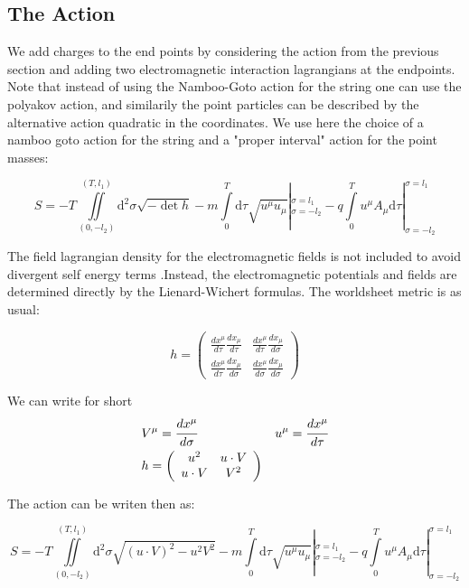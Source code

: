 \documentclass[11pt,a4paper]{article}
\begin{document}
\FloatBarrier
\subsection{The Action}

We add charges to the end points by considering the action from the previous section and adding two electromagnetic interaction lagrangians at the endpoints. Note that instead of using the Namboo-Goto action for the string one can use the polyakov action, and similarily the point particles can be described by the alternative action quadratic in the coordinates. We use here the choice of a namboo goto action for the string and a "proper interval" action for the point masses:

\begin{equation}
S=-T\iint\limits_{(0,-l_{2})}^{(T,l_{1})}\mathrm{d}^{2}\sigma\sqrt{-\det h}-m\int\limits_{0}^{T}\mathrm{d}\tau\sqrt{u^{\mu}u_{\mu}}|_{\sigma=-l_{2}}^{\sigma=l_{1}}-q\int\limits_{0}^{T}u^{\mu}A_{\mu}\mathrm{d}\tau|_{\sigma=-l_{2}}^{\sigma=l_{1}}
\end{equation}

The field lagrangian density for the electromagnetic fields is not included to avoid divergent self energy terms .Instead, the electromagnetic potentials and fields are determined directly by the Lienard-Wichert formulas. The worldsheet metric is as usual:

\begin{equation*}
h=
\begin{pmatrix}
\frac{dx^{\mu}}{d\tau}\frac{dx_{\mu}}{d\tau} & \frac{dx^{\mu}}{d\tau}\frac{dx_{\mu}}{d\sigma}\\
\frac{dx^{\mu}}{d\tau}\frac{dx_{\mu}}{d\sigma} & \frac{dx^{\mu}}{d\sigma}\frac{dx_{\mu}}{d\sigma}\end{pmatrix}
\end{equation*} 

We can write for short \begin{align*}
&V^{\mu}=\cfrac{dx^{\mu}}{d\sigma} & u^{\mu}=\cfrac{dx^{\mu}}{d\tau} \\
&h=\left(\begin{array}{cc} u^{2} & u\cdot V\\ u\cdot V & V^{2} \end{array}\right)
\end{align*} 

The action can be writen then as:

\begin{equation}
S=-T\iint\limits_{(0,-l_{2})}^{(T,l_{1})}\mathrm{d}^{2}\sigma\sqrt{\left(u\cdot V\right)^{2}-u^{2}V^{2}}-m\int\limits_{0}^{T}\mathrm{d}\tau\sqrt{u^{\mu}u_{\mu}}|_{\sigma=-l_{2}}^{\sigma=l_{1}}-q\int\limits_{0}^{T}u^{\mu}A_{\mu}\mathrm{d}\tau|_{\sigma=-l_{2}}^{\sigma=l_{1}} 
\end{equation}
 
\end{document}
